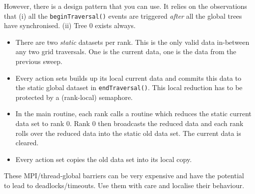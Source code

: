 However, there is a design pattern that you can use.
It relies on the observations that (i) all the \texttt{beginTraversal()} events
are triggered \emph{after} all the global trees have synchronised.
(ii) Tree 0 exists always.


\begin{itemize}
  \item There are two \emph{static} datasets per rank. This is the only valid
  data in-between any two grid traversals. One is the current data, one is the
  data from the previous sweep.
  \item Every action sets builds up its local current data and commits this 
  data to the static global dataset in \texttt{endTraversal()}. This local
  reduction has to be protected by a (rank-local) semaphore.
  \item In the main routine, each rank calls a routine which reduces the
  static current data set to rank 0. Rank 0 then broadcasts the reduced data and
  each rank rolls over the reduced data into the static old data set. The
  current data is cleared.
  \item Every action set copies the old data set into its local copy.
\end{itemize}


\begin{remark}
  These MPI/thread-global barriers can be very expensive and have the potential
  to lead to deadlocks/timeouts. Use them with care and localise their
  behaviour.
\end{remark}

